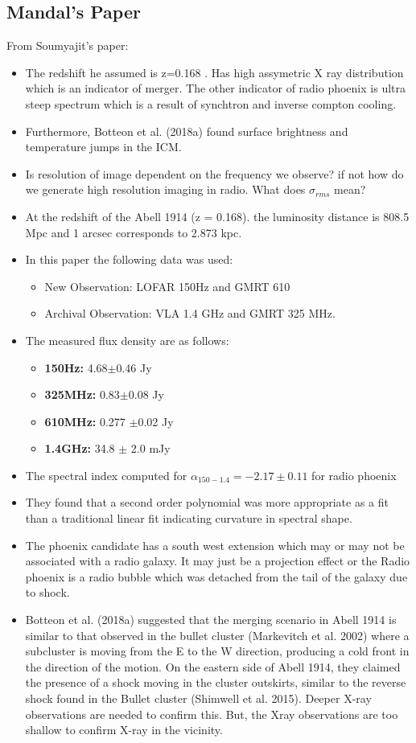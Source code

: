 \documentclass[11pt]{report}
\newcommand{\tbf}[1]{\textbf{#1}}
\begin{document}
\subsection{Mandal's Paper}
From Soumyajit's paper:
\begin{itemize}
\item The redshift he assumed is z=0.168 . Has high assymetric X ray distribution which is an indicator of merger. The other indicator of radio phoenix is ultra steep spectrum which is a result of synchtron and inverse compton cooling.
\item Furthermore, Botteon et al. (2018a) found surface brightness and temperature jumps in the ICM. 
\item Is resolution of image dependent on the frequency we observe? if not how do we generate high resolution imaging in radio. What does $\sigma_{rms}$ mean?
\item At the redshift of the Abell 1914 (z = 0.168). the luminosity distance is 808.5 Mpc and 1 arcsec corresponds to 2.873 kpc.
\item In this paper the following data was used:
\begin{itemize}
\item New Observation: LOFAR 150Hz and GMRT 610
\item Archival Observation: VLA 1.4 GHz and GMRT 325 MHz.
\end{itemize}
\item The measured flux density are as follows:
\begin{itemize}
\item \tbf{150Hz:} 4.68$\pm$0.46 Jy
\item \tbf{325MHz:} 0.83$\pm$0.08 Jy
\item \tbf{610MHz:} 0.277 $\pm$0.02 Jy
\item \tbf{1.4GHz:} 34.8 $\pm$ 2.0 mJy
\end{itemize}
\item The spectral index computed for $\alpha_{150-1.4}=-2.17 \pm 0.11$ for radio phoenix
\item They found that a second order polynomial was more appropriate as a fit than a traditional linear fit indicating curvature in spectral shape.
\item The phoenix candidate has a south west extension which may or may not be associated with a radio galaxy. It may just be a projection effect or the Radio phoenix is a radio bubble which was detached from the tail of the galaxy due to shock.
\item Botteon et al. (2018a) suggested that the merging scenario in Abell 1914 is similar to that observed in the bullet cluster (Markevitch et al. 2002) where a subcluster is moving from the E to the W direction, producing a cold front in the direction of the motion. On the eastern side of Abell 1914, they claimed the presence of a shock moving in the cluster outskirts, similar to the reverse shock found in the Bullet cluster (Shimwell et al. 2015). Deeper X-ray observations are needed to confirm this. But, the Xray observations are too shallow to confirm X-ray in the vicinity.
\end{itemize}
\end{document}
